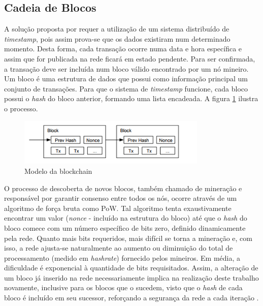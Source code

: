 \documentclass[a4paper,12pt]{monografia}
\theoremstyle{plain}
\theoremstyle{definition}
\theoremstyle{remark}
\begin{document}
\subsection{Cadeia de Blocos}

A solu\c{c}\~ao proposta por  requer a utiliza\c{c}\~ao de um sistema distribu\'ido de \textit{timestamp}, pois assim prova-se que os dados existiram num determinado momento.
Desta forma, cada transa\c{c}\~ao ocorre numa data e hora espec\'ifica e assim que for publicada na rede ficar\'a em estado pendente.
Para ser confirmada, a transa\c{c}\~ao deve ser inclu\'ida num bloco v\'alido encontrado por um n\'o mineiro.
Um bloco \'e uma estrutura de dados que possui como informa\c{c}\~ao principal um conjunto de transa\c{c}\~oes.
Para que o sistema de \textit{timestamp} funcione, cada bloco possui o \textit{hash} do bloco anterior, formando uma lista encadeada.
A figura \ref{fig:blockchain} ilustra o processo.

\begin{figure}[ht]
 \begin{center}
   \includegraphics[width=90mm,scale=1.0]{./figs/blockchain.png}
   \caption{Modelo da blockchain}
   \label{fig:blockchain}
 \end{center}
\end{figure}

O processo de descoberta de novos blocos, tamb\'{e}m chamado de minera\c{c}\~{a}o e respons\'avel por garantir consenso entre todos os n\'os, ocorre atrav\'es de um algoritmo de for\c{c}a bruta como PoW.
Tal algoritmo tenta exaustivamente encontrar um valor (\textit{nonce} - inclu\'ido na estrutura do bloco) at\'e que o \textit{hash} do bloco comece com um n\'umero espec\'ifico de bits zero, definido dinamicamente pela rede.
Quanto mais bits requeridos, mais dif\'icil se torna a minera\c{c}\~ao e, com isso, a rede ajusta-se naturalmente ao aumento ou diminui\c{c}\~ao do total de processamento (medido em \textit{hashrate}) fornecido pelos mineiros.
Em m\'edia, a dificuldade \'e exponencial \`a quantidade de bits requisitados.
Assim, a altera\c{c}\~ao de um bloco j\'a inserido na rede necessariamente implica na realiza\c{c}\~ao deste trabalho novamente, inclusive para os blocos que o sucedem, visto que o \textit{hash} de cada bloco \'e inclu\'ido em seu sucessor, refor\c{c}ando a seguran\c{c}a da rede a cada itera\c{c}\~ao \cite{bitcoin}.
\end{document}
